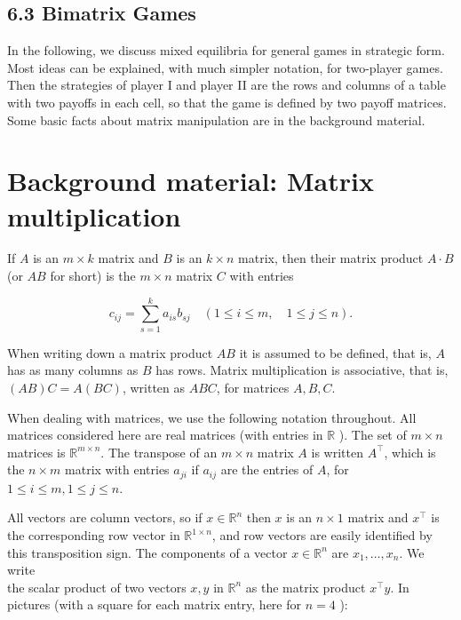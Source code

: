 \documentclass[12pt]{article}
\begin{document}
\subsection*{6.3 Bimatrix Games}
In the following, we discuss mixed equilibria for general games in strategic form. Most ideas can be explained, with much simpler notation, for two-player games. Then the strategies of player I and player II are the rows and columns of a table with two payoffs in each cell, so that the game is defined by two payoff matrices. Some basic facts about matrix manipulation are in the background material.

\section*{Background material: Matrix multiplication}
If $A$ is an $m \times k$ matrix and $B$ is an $k \times n$ matrix, then their matrix product $A \cdot B$ (or $A B$ for short) is the $m \times n$ matrix $C$ with entries


\begin{equation*}
c_{i j}=\sum_{s=1}^{k} a_{i s} b_{s j} \quad(1 \leq i \leq m, \quad 1 \leq j \leq n) . \tag{6.1}
\end{equation*}


When writing down a matrix product $A B$ it is assumed to be defined, that is, $A$ has as many columns as $B$ has rows. Matrix multiplication is associative, that is, $(A B) C=A(B C)$, written as $A B C$, for matrices $A, B, C$.

When dealing with matrices, we use the following notation throughout. All matrices considered here are real matrices (with entries in $\mathbb{R}$ ). The set of $m \times n$ matrices is $\mathbb{R}^{m \times n}$. The transpose of an $m \times n$ matrix $A$ is written $A^{\top}$, which is the $n \times m$ matrix with entries $a_{j i}$ if $a_{i j}$ are the entries of $A$, for $1 \leq i \leq m, 1 \leq j \leq n$.

All vectors are column vectors, so if $x \in \mathbb{R}^{n}$ then $x$ is an $n \times 1$ matrix and $x^{\top}$ is the corresponding row vector in $\mathbb{R}^{1 \times n}$, and row vectors are easily identified by this transposition sign. The components of a vector $x \in \mathbb{R}^{n}$ are $x_{1}, \ldots, x_{n}$. We write\\
the scalar product of two vectors $x, y$ in $\mathbb{R}^{n}$ as the matrix product $x^{\top} y$. In pictures (with a square for each matrix entry, here for $n=4$ ):
\end{document}

